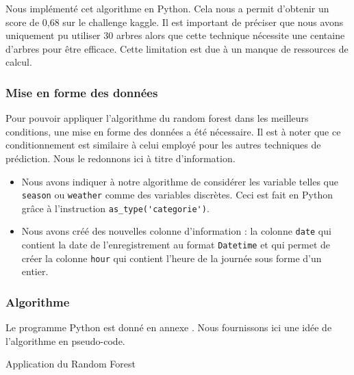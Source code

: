 Nous implémenté cet algorithme en Python. Cela nous a permit d'obtenir un score de 0,68 sur le challenge kaggle. Il est important de préciser que nous avons uniquement pu utiliser 30 arbres alors que cette technique nécessite une centaine d'arbres pour être efficace. Cette limitation est due à un manque de ressources de calcul.\\

\subsubsection{Mise en forme des données}

Pour pouvoir appliquer l'algorithme du random forest dans les meilleurs conditions, une mise en forme des données a été nécessaire. Il est à noter que ce conditionnement est similaire à celui employé pour les autres techniques de prédiction. Nous le redonnons ici à titre d'information.\\

\begin{itemize}[label=$\circ$]
\item Nous avons indiquer à notre algorithme de considérer les variable telles que \verb|season| ou \verb|weather| comme des variables discrètes. Ceci est fait en Python grâce à l'instruction \verb|as_type('categorie')|.
\item Nous avons créé des nouvelles colonne d'information : la colonne \verb|date| qui contient la date de l'enregistrement au format \verb|Datetime| et qui permet de créer la colonne \verb|hour| qui contient l'heure de la journée sous forme d'un entier.
\end{itemize}

\subsubsection{Algorithme}

Le programme Python est donné en annexe . Nous fournissons ici une idée de l'algorithme en pseudo-code.

\begin{algorithm}[H]

	\caption{\label{randomforestpython}Application du Random Forest}
\end{algorithm}

